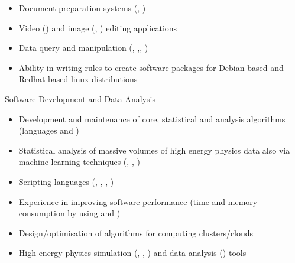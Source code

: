 \begin{cvskills}
{\begin{minipage}{0.48\textwidth}
\begin{itemize}[labelwidth=\the\widest,align=right,leftmargin=!,labelsep=1pt,noitemsep]
\item[\custItem] Document preparation systems ({\color{awesome}{\LaTeX}},
{\color{awesome}{\TeX}})
\item[\custItem] Video (\textsc{\color{awesome}{Adobe Premiere}}) and
image (\textsc{\color{awesome}{Adobe Photoshop}},
\textsc{\color{awesome}{Gimp}}) editing applications
\item[\custItem] Data query and manipulation (\textsc{\color{awesome}{sql}}, 
\textsc{\color{awesome}{json}},\textsc{\color{awesome}{xml}},
\textsc{\color{awesome}{csv}})
\item[\custItem] Ability in writing rules to create software packages for
Debian-based and Redhat-based linux distributions
\end{itemize}
\end{minipage}
}

\cvskill
{Software Development and Data Analysis}%
{
\begin{minipage}{0.49\textwidth}
\begin{itemize}[labelwidth=\the\widest,align=right,leftmargin=!,labelsep=1pt,noitemsep]
\item[\custItem] Development and maintenance of core, statistical and analysis
algorithms (languages \textsc{\color{awesome}{C/C++}} and 
\textsc{\color{awesome}{Python}})
\item[\custItem] Statistical analysis of massive volumes of high energy physics
data also via machine learning techniques (\textsc{\color{awesome}{TMVA}},
\textsc{\color{awesome}{BDT}}, \textsc{\color{awesome}{TensorFlow}})
\item[\custItem] Scripting languages (\textsc{\color{awesome}{bash}},
\textsc{\color{awesome}{sh}}, \textsc{\color{awesome}{ksh}},
\textsc{\color{awesome}{csh}})
\end{itemize}
\end{minipage}
\hfill
\begin{minipage}{0.49\textwidth}
\begin{itemize}[labelwidth=\the\widest,align=right,leftmargin=!,labelsep=1pt,noitemsep]
\item[\custItem] Experience in improving software performance (time and memory
consumption by using \textsc{\color{awesome}{top/htop}} and
\textsc{\color{awesome}{Valgrind}})
\item[\custItem] Design/optimisation of algorithms for computing
clusters/clouds
\item[\custItem] High energy physics simulation
(\textsc{\color{awesome}{Powheg}}, \textsc{\color{awesome}{Pythia}},
\textsc{\color{awesome}{Madgraph}}) and data analysis
(\textsc{\color{awesome}{ROOT}}) tools
\end{itemize}
\end{minipage}
}


\end{cvskills}
